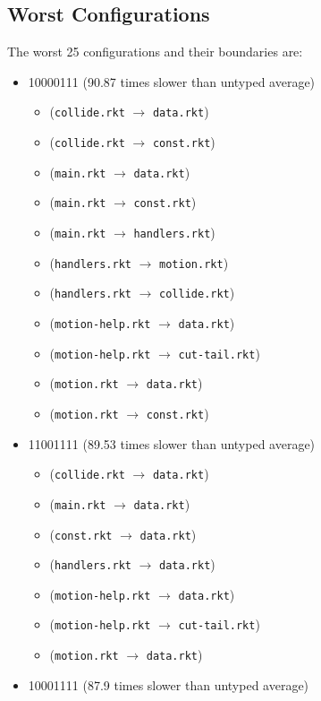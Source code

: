 \documentclass{article}
\newcommand{\mono}[1]{\texttt{#1}}
\begin{document}
\subsection{Worst Configurations}
The worst 25 configurations and their boundaries are:
\begin{itemize}
\item 10000111 (90.87 times slower than untyped average)
  \begin{itemize}
  \item (\mono{collide.rkt} $\rightarrow$ \mono{data.rkt})
  \item (\mono{collide.rkt} $\rightarrow$ \mono{const.rkt})
  \item (\mono{main.rkt} $\rightarrow$ \mono{data.rkt})
  \item (\mono{main.rkt} $\rightarrow$ \mono{const.rkt})
  \item (\mono{main.rkt} $\rightarrow$ \mono{handlers.rkt})
  \item (\mono{handlers.rkt} $\rightarrow$ \mono{motion.rkt})
  \item (\mono{handlers.rkt} $\rightarrow$ \mono{collide.rkt})
  \item (\mono{motion-help.rkt} $\rightarrow$ \mono{data.rkt})
  \item (\mono{motion-help.rkt} $\rightarrow$ \mono{cut-tail.rkt})
  \item (\mono{motion.rkt} $\rightarrow$ \mono{data.rkt})
  \item (\mono{motion.rkt} $\rightarrow$ \mono{const.rkt})
  \end{itemize}
\item 11001111 (89.53 times slower than untyped average)
  \begin{itemize}
  \item (\mono{collide.rkt} $\rightarrow$ \mono{data.rkt})
  \item (\mono{main.rkt} $\rightarrow$ \mono{data.rkt})
  \item (\mono{const.rkt} $\rightarrow$ \mono{data.rkt})
  \item (\mono{handlers.rkt} $\rightarrow$ \mono{data.rkt})
  \item (\mono{motion-help.rkt} $\rightarrow$ \mono{data.rkt})
  \item (\mono{motion-help.rkt} $\rightarrow$ \mono{cut-tail.rkt})
  \item (\mono{motion.rkt} $\rightarrow$ \mono{data.rkt})
  \end{itemize}
\item 10001111 (87.9 times slower than untyped average)

\end{itemize}
\end{document}
